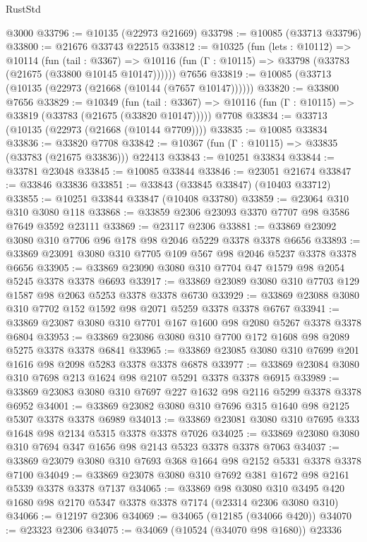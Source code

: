 \begin{lexlean}{RustStd}
\begin{coremodule}
    @3000
@33796 := @10135 (@22973 @21669)
@33798 := @10085 (@33713 @33796)
@33800 := @21676 @33743 @22515
@33812 := @10325
    (fun (lets : @10112) =>
    @10114
      (fun (tail : @3367) =>
      @10116 (fun (Γ : @10115) => @33798 (@33783 (@21675 (@33800 @10145 @10147))))))
    @7656
@33819 := @10085 (@33713 (@10135 (@22973 (@21668 (@10144 (@7657 @10147))))))
@33820 := @33800 @7656
@33829 := @10349
    (fun (tail : @3367) => @10116 (fun (Γ : @10115) => @33819 (@33783 (@21675 (@33820 @10147)))))
    @7708
@33834 := @33713 (@10135 (@22973 (@21668 (@10144 @7709))))
@33835 := @10085 @33834
@33836 := @33820 @7708
@33842 := @10367 (fun (Γ : @10115) => @33835 (@33783 (@21675 @33836))) @22413
@33843 := @10251 @33834
@33844 := @33781 @23048
@33845 := @10085 @33844
@33846 := @23051 @21674
@33847 := @33846 @33836
@33851 := @33843 (@33845 @33847) (@10403 @33712)
@33855 := @10251 @33844 @33847 (@10408 @33780)
@33859 := @23064 @310 @310 @3080 @118
@33868 := @33859 @2306 @23093 @3370 @7707 @98 @3586 @7649 @3592 @23111
@33869 := @23117 @2306
@33881 := @33869 @23092 @3080 @310 @7706 @96 @178 @98 @2046 @5229 @3378 @3378 @6656
@33893 := @33869 @23091 @3080 @310 @7705 @109 @567 @98 @2046 @5237 @3378 @3378 @6656
@33905 := @33869 @23090 @3080 @310 @7704 @47 @1579 @98 @2054 @5245 @3378 @3378 @6693
@33917 := @33869 @23089 @3080 @310 @7703 @129 @1587 @98 @2063 @5253 @3378 @3378 @6730
@33929 := @33869 @23088 @3080 @310 @7702 @152 @1592 @98 @2071 @5259 @3378 @3378 @6767
@33941 := @33869 @23087 @3080 @310 @7701 @167 @1600 @98 @2080 @5267 @3378 @3378 @6804
@33953 := @33869 @23086 @3080 @310 @7700 @172 @1608 @98 @2089 @5275 @3378 @3378 @6841
@33965 := @33869 @23085 @3080 @310 @7699 @201 @1616 @98 @2098 @5283 @3378 @3378 @6878
@33977 := @33869 @23084 @3080 @310 @7698 @213 @1624 @98 @2107 @5291 @3378 @3378 @6915
@33989 := @33869 @23083 @3080 @310 @7697 @227 @1632 @98 @2116 @5299 @3378 @3378 @6952
@34001 := @33869 @23082 @3080 @310 @7696 @315 @1640 @98 @2125 @5307 @3378 @3378 @6989
@34013 := @33869 @23081 @3080 @310 @7695 @333 @1648 @98 @2134 @5315 @3378 @3378 @7026
@34025 := @33869 @23080 @3080 @310 @7694 @347 @1656 @98 @2143 @5323 @3378 @3378 @7063
@34037 := @33869 @23079 @3080 @310 @7693 @368 @1664 @98 @2152 @5331 @3378 @3378 @7100
@34049 := @33869 @23078 @3080 @310 @7692 @381 @1672 @98 @2161 @5339 @3378 @3378 @7137
@34065 := @33869
    @98
    @3080
    @310
    @3495
    @420
    @1680
    @98
    @2170
    @5347
    @3378
    @3378
    @7174
    (@23314 @2306 @3080 @310)
@34066 := @12197 @2306
@34069 := @34065 (@12185 (@34066 @420))
@34070 := @23323 @2306
@34075 := @34069 (@10524 (@34070 @98 @1680)) @23336

\end{coremodule}
\end{lexlean}
